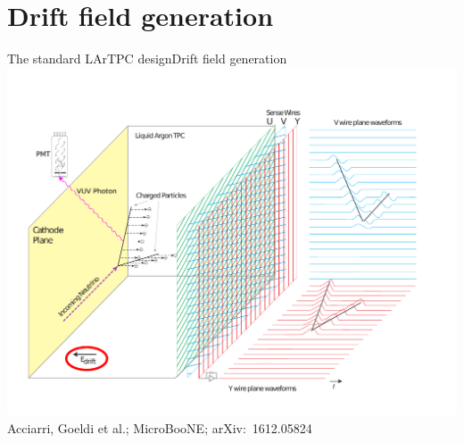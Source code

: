 \documentclass[]{beamer}
\newcommand*{\uboone}{{MicroBooNE}}
\newcommand*{\lartpc}{{LArTPC}}
\begin{document}
\section{Drift field generation}

\begin{frame}{The standard \lartpc{} design}{Drift field generation}
	\centering
	\includegraphics[viewport=35 40 720 540, clip, height=.66\textheight]{defence/TPCprinciple_HV}\\
	{\tiny Acciarri, Goeldi et al.; \uboone{}; arXiv:~1612.05824~\cite{uboone}}
\end{frame}
\end{document}
